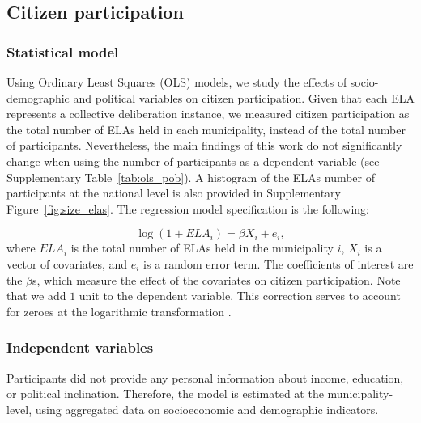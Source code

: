 \documentclass[onecolumn]{article}
\begin{document}

\subsection*{Citizen participation}

\subsubsection*{Statistical model}

Using Ordinary Least Squares (OLS) models, we study the effects of socio-demographic and political variables on citizen participation. Given that each ELA represents a collective deliberation instance, we measured citizen participation as the total number of ELAs held in each municipality, instead of the total number of participants. Nevertheless, the main findings of this work do not significantly change when using the number of participants as a dependent variable (see Supplementary Table~\ref{tab:ols_pob}). A histogram of the ELAs number of participants at the national level is also provided in Supplementary Figure~\ref{fig:size_elas}. The regression model specification is the following:

\begin{equation}
    \log (1 + ELA_i) =  \beta  X_i + e_i,\label{eq:ols}
\end{equation}
where $ELA_i$ is the total number of ELAs held in the municipality $i$, $X_i$ is a vector of covariates, and $e_i$ is a random error term. The coefficients of interest are the $\beta$s, which measure the effect of the covariates on citizen participation. Note that we add $1$ unit to the dependent variable. This correction serves to account for zeroes at the logarithmic transformation \cite{McCune2002Analysis}.

\subsubsection*{Independent variables}
Participants did not provide any personal information about income, education, or political inclination. Therefore, the model is estimated at the municipality-level, using aggregated data on socioeconomic and demographic indicators.
\end{document}
